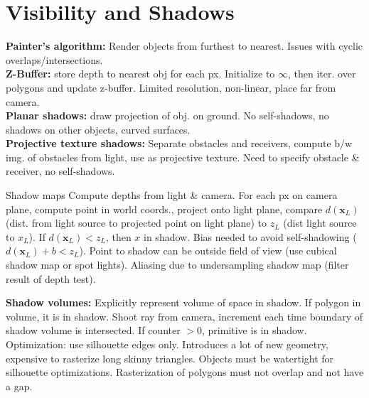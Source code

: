\documentclass[a4paper,9pt]{article}
\begin{document}
\section{Visibility and Shadows}
\textbf{Painter's algorithm:} Render objects from furthest to nearest. Issues with cyclic overlaps/intersections.\\
\textbf{Z-Buffer:} store depth to nearest obj for each px. Initialize to $\infty$, then iter. over polygons and update z-buffer. Limited resolution, non-linear, place far from camera.\\
\textbf{Planar shadows:} draw projection of obj. on ground. No self-shadows, no shadows on other objects, curved surfaces.\\
\textbf{Projective texture shadows:} Separate obstacles and receivers, compute b/w img. of obstacles from light, use as projective texture. Need to specify obstacle \& receiver, no self-shadows.\\
\begin{subbox}{Shadow maps}
Compute depths from light \& camera. For each px on camera plane, compute point in world coords., project onto light plane, compare $d(\mathbf{x}_L)$ (dist. from light source to projected point on light plane) to $z_L$ (dist light source to $x_L$). If $d(\mathbf{x}_L) < z_L$, then $x$ in shadow. Bias needed to avoid self-shadowing ($d(\mathbf{x}_L) + b < z_L$). Point to shadow can be outside field of view (use cubical shadow map or spot lights). Aliasing due to undersampling shadow map (filter result of depth test).
\end{subbox}
\textbf{Shadow volumes:} Explicitly represent volume of space in shadow. If polygon in volume, it is in shadow. Shoot ray from camera, increment each time boundary of shadow volume is intersected. If counter $> 0$, primitive is in shadow. Optimization: use silhouette edges only. Introduces a lot of new geometry, expensive to rasterize long skinny triangles. Objects must be watertight for silhouette optimizations. Rasterization of polygons must not overlap and not have a gap.
\end{document}
